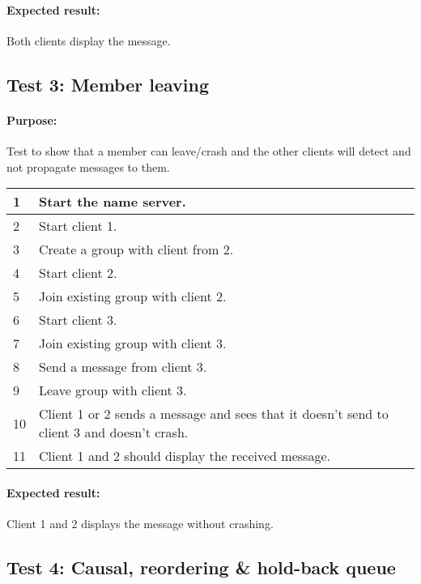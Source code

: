 \paragraph{Expected result:} Both clients display the message.

\subsection*{Test 3: Member leaving}
\paragraph{Purpose:} Test to show that a member can leave/crash and the other clients will detect and not propagate messages to them.
\begin{table}[h!]
	\begin{tabularx}{\textwidth}{|l|X|p{8pt}|}
		\hline
		1 & Start the name server. & \\
		\hline
		2 & Start client   1. & \\
		\hline
		3 & Create a group with client from 2. & \\
		\hline
		4 & Start client   2. & \\
		\hline
		5 & Join existing group with client 2. & \\
		\hline
		6 & Start client   3. & \\
		\hline
		7 & Join existing group with client 3. & \\
		\hline
		8 & Send a message from client 3. & \\
		\hline		
		9 & Leave group with client 3. & \\
		\hline
		10 & Client 1 or 2 sends a message and sees that it doesn't send to client 3 and doesn't crash.& \\
		\hline
		11 & Client 1 and 2 should display the received message.& \\
		\hline		
	\end{tabularx}
\end{table}

\paragraph{Expected result: } Client 1 and 2 displays the message without crashing.

\subsection*{Test 4: Causal, reordering \& hold-back queue}

